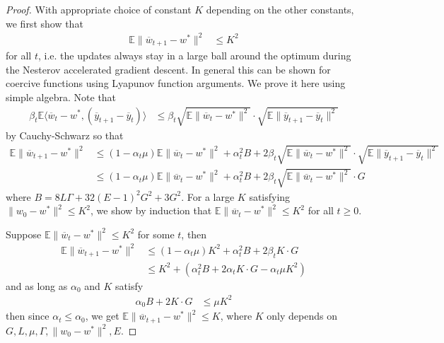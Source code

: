 \begin{proof}
	With appropriate choice of constant $K$ depending on the other constants,
	we first show that 
	\begin{align*}
	\mathbb{E}\|\overline{w}_{t+1}-w^{\ast}\|^{2} & \leq K^{2}
	\end{align*}
	for all $t$, i.e. the updates always stay in a large ball around
	the optimum during the Nesterov accelerated gradient descent. In general
	this can be shown for coercive functions using Lyapunov function arguments.
	We prove it here using simple algebra. Note that
	\begin{align*}
	\beta_{t}\mathbb{E}\langle\overline{w}_{t}-w^{\ast},(\overline{y}_{t+1}-\overline{y}_{t})\rangle & \leq\beta_{t}\sqrt{\mathbb{E}\|\overline{w}_{t}-w^{\ast}\|^{2}}\cdot\sqrt{\mathbb{E}\|\overline{y}_{t+1}-\overline{y}_{t}\|^{2}}
	\end{align*}
	by Cauchy-Schwarz so that 
	\begin{align*}
	\mathbb{E}\|\overline{w}_{t+1}-w^{\ast}\|^{2} & \leq(1-\alpha_{t}\mu)\mathbb{E}\|\overline{w}_{t}-w^{\ast}\|^{2}+\alpha_{t}^{2}B+2\beta_{t}\sqrt{\mathbb{E}\|\overline{w}_{t}-w^{\ast}\|^{2}}\cdot\sqrt{\mathbb{E}\|\overline{y}_{t+1}-\overline{y}_{t}\|^{2}}\\
	& \leq(1-\alpha_{t}\mu)\mathbb{E}\|\overline{w}_{t}-w^{\ast}\|^{2}+\alpha_{t}^{2}B+2\beta_{t}\sqrt{\mathbb{E}\|\overline{w}_{t}-w^{\ast}\|^{2}}\cdot G
	\end{align*}
	where $B=8L\Gamma+32(E-1)^{2}G^{2}+3G^{2}$. For a large $K$ satisfying
	$\|w_{0}-w^{\ast}\|^{2}\leq K^{2}$, we show by induction that $\mathbb{E}\|\overline{w}_{t}-w^{\ast}\|^{2}\leq K^{2}$
	for all $t\geq0$. 
	
	Suppose $\mathbb{E}\|\overline{w}_{t}-w^{\ast}\|^{2}\leq K^{2}$ for
	some $t$, then 
	\begin{align*}
	\mathbb{E}\|\overline{w}_{t+1}-w^{\ast}\|^{2} & \leq(1-\alpha_{t}\mu)K^{2}+\alpha_{t}^{2}B+2\beta_{t}K\cdot G\\
	& \leq K^{2}+(\alpha_{t}^{2}B+2\alpha_{t}K\cdot G-\alpha_{t}\mu K^{2})
	\end{align*}
	and as long as $\alpha_{0}$ and $K$ satisfy 
	\begin{align*}
	\alpha_{0}B+2K\cdot G & \leq\mu K^{2}
	\end{align*}
	then since $\alpha_{t}\leq\alpha_{0}$, we get $\mathbb{E}\|\overline{w}_{t+1}-w^{\ast}\|^{2}\leq K$,
	where $K$ only depends on $G,L,\mu,\Gamma,\|w_{0}-w^{\ast}\|^{2},E$. 
	

\end{proof}
